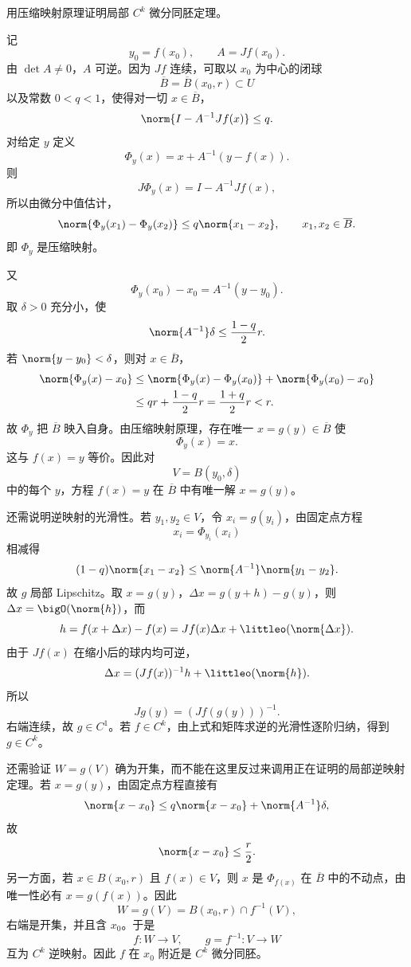 \begin{xreferenceproblem}[20.5.2 第二组参考题 1]
用压缩映射原理证明局部 $C^k$ 微分同胚定理。
\end{xreferenceproblem}
\begin{xsolution}
记
\[
  y_0=f(x_0),
  \qquad A=Jf(x_0).
\]
由 $\det A\ne0$，$A$ 可逆。因为 $Jf$ 连续，可取以 $x_0$ 为中心的闭球
\[
  \overline B=\overline B(x_0,r)\subset U
\]
以及常数 $0<q<1$，使得对一切 $x\in\overline B$，
\[
  \norm{I-A^{-1}Jf(x)}\le q.
\]
对给定 $y$ 定义
\[
  \Phi_y(x)=x+A^{-1}(y-f(x)).
\]
则
\[
  J\Phi_y(x)=I-A^{-1}Jf(x),
\]
所以由微分中值估计，
\[
  \norm{\Phi_y(x_1)-\Phi_y(x_2)}
  \le q\norm{x_1-x_2},
  \qquad x_1,x_2\in\overline B.
\]
即 $\Phi_y$ 是压缩映射。

又
\[
  \Phi_y(x_0)-x_0=A^{-1}(y-y_0).
\]
取 $\delta>0$ 充分小，使
\[
  \norm{A^{-1}}\delta\le\frac{1-q}{2}r.
\]
若 $\norm{y-y_0}<\delta$，则对 $x\in\overline B$，
\begin{align*}
  \norm{\Phi_y(x)-x_0}
  &\le\norm{\Phi_y(x)-\Phi_y(x_0)}
      +\norm{\Phi_y(x_0)-x_0}\\
  &\le qr+\frac{1-q}{2}r
   =\frac{1+q}{2}r<r.
\end{align*}
故 $\Phi_y$ 把 $\overline B$ 映入自身。由压缩映射原理，存在唯一 $x=g(y)\in\overline B$ 使
\[
  \Phi_y(x)=x.
\]
这与 $f(x)=y$ 等价。因此对
\[
  V=B(y_0,\delta)
\]
中的每个 $y$，方程 $f(x)=y$ 在 $\overline B$ 中有唯一解 $x=g(y)$。

还需说明逆映射的光滑性。若 $y_1,y_2\in V$，令 $x_i=g(y_i)$，由固定点方程
\[
  x_i=\Phi_{y_i}(x_i)
\]
相减得
\[
  (1-q)\norm{x_1-x_2}
  \le\norm{A^{-1}}\norm{y_1-y_2}.
\]
故 $g$ 局部 Lipschitz。取 $x=g(y)$，$\Delta x=g(y+h)-g(y)$，则 $\Delta x=\bigO(\norm{h})$，而
\[
  h=f(x+\Delta x)-f(x)
   =Jf(x)\Delta x+\littleo(\norm{\Delta x}).
\]
由于 $Jf(x)$ 在缩小后的球内均可逆，
\[
  \Delta x=(Jf(x))^{-1}h+\littleo(\norm{h}).
\]
所以
\[
  Jg(y)=(Jf(g(y)))^{-1}.
\]
右端连续，故 $g\in C^1$。若 $f\in C^k$，由上式和矩阵求逆的光滑性逐阶归纳，得到 $g\in C^k$。

还需验证 $W=g(V)$ 确为开集，而不能在这里反过来调用正在证明的局部逆映射定理。若 $x=g(y)$，由固定点方程直接有
\[
  \norm{x-x_0}
  \le q\norm{x-x_0}+\norm{A^{-1}}\delta,
\]
故
\[
  \norm{x-x_0}\le\frac r2.
\]
另一方面，若 $x\in B(x_0,r)$ 且 $f(x)\in V$，则 $x$ 是 $\Phi_{f(x)}$ 在 $\overline B$ 中的不动点，由唯一性必有 $x=g(f(x))$。因此
\[
  W=g(V)=B(x_0,r)\cap f^{-1}(V),
\]
右端是开集，并且含 $x_0$。于是
\[
  f\colon W\to V,
  \qquad g=f^{-1}\colon V\to W
\]
互为 $C^k$ 逆映射。因此 $f$ 在 $x_0$ 附近是 $C^k$ 微分同胚。
\end{xsolution}

